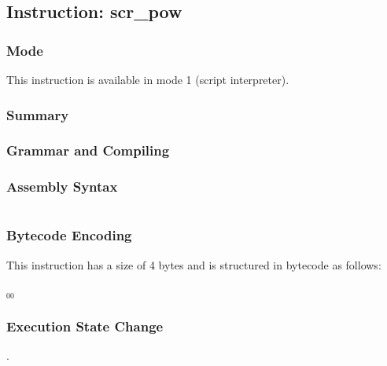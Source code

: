 \subsection{Instruction: scr\_pow}

\subsubsection{Mode}
This instruction is available in mode 1 (script interpreter).
\subsubsection{Summary}


\subsubsection{Grammar and Compiling}


\subsubsection{Assembly Syntax}

\begin{myquote}
\begin{verbatim}

\end{verbatim}
\end{myquote}

\subsubsection{Bytecode Encoding}

This instruction has a size of 4 bytes and is structured in bytecode as follows:

$_{00}$\ 

\subsubsection{Execution State Change}

.


